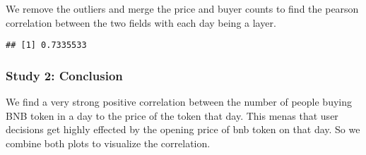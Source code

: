 \documentclass[]{article}
\newenvironment{Shaded}{\begin{snugshade}}{\end{snugshade}}
\newcommand{\KeywordTok}[1]{\textcolor[rgb]{0.13,0.29,0.53}{\textbf{#1}}}
\newcommand{\DataTypeTok}[1]{\textcolor[rgb]{0.13,0.29,0.53}{#1}}
\newcommand{\StringTok}[1]{\textcolor[rgb]{0.31,0.60,0.02}{#1}}
\newcommand{\CommentTok}[1]{\textcolor[rgb]{0.56,0.35,0.01}{\textit{#1}}}
\newcommand{\OperatorTok}[1]{\textcolor[rgb]{0.81,0.36,0.00}{\textbf{#1}}}
\newcommand{\NormalTok}[1]{#1}
\begin{document}
We remove the outliers and merge the price and buyer counts to find the
pearson correlation between the two fields with each day being a layer.

\begin{Shaded}
\end{Shaded}

\begin{verbatim}
## [1] 0.7335533
\end{verbatim}

\subsubsection{Study 2: Conclusion}\label{study-2-conclusion}

We find a very strong positive correlation between the number of people
buying BNB token in a day to the price of the token that day. This menas
that user decisions get highly effected by the opening price of bnb
token on that day. So we combine both plots to visualize the
correlation.
\end{document}
